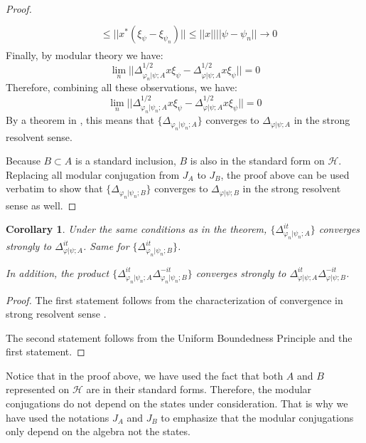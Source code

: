 \documentclass[a4paper,11pt]{article}
\newtheorem{corollary}[theorem]{Corollary}
\theoremstyle{definition}
\theoremstyle{remark}
\begin{document}
\begin{proof}
\begin{align}
\begin{split}
            \\&
            \leq ||x^*(\xi_\psi - \xi_{\psi_n})|| \leq ||x||||\psi - \psi_n||\rightarrow 0
        \end{split}
    \end{align}
    Finally, by modular theory we have:
    \begin{equation}
        \lim_n||\Delta^{1/2}_{\varphi_n|\psi;A}x\xi_\psi - \Delta^{1/2}_{\varphi|\psi;A}x\xi_\psi|| = 0
    \end{equation}
    Therefore, combining all these observations, we have:
    \begin{equation}
        \lim_n||\Delta^{1/2}_{\varphi_n|\psi_n;A}x\xi_\psi - \Delta^{1/2}_{\varphi|\psi;A}x\xi_\psi|| = 0
    \end{equation}
    By a theorem in \cite{takesaki2}, this means that $\{\Delta_{\varphi_n|\psi_n;A}\}$ converges to $\Delta_{\varphi|\psi;A}$ in the strong resolvent sense. 

    Because $B\subset A$ is a standard inclusion, $B$ is also in the standard form on $\mathcal{H}$. Replacing all modular conjugation from $J_A$ to $J_B$, the proof above can be used verbatim to show that $\{\Delta_{\varphi_n|\psi_n;B}\}$ converges to $\Delta_{\varphi|\psi;B}$ in the strong resolvent sense as well.
\end{proof}
\begin{corollary}
    Under the same conditions as in the theorem, $\{\Delta^{it}_{\varphi_n|\psi_n;A}\}$ converges strongly to $\Delta^{it}_{\varphi|\psi;A}$. Same for $\{\Delta^{it}_{\varphi_n|\psi_n;B}\}$.

    In addition, the product $\{\Delta^{it}_{\varphi_n|\psi_n;A}\Delta^{-it}_{\varphi_n|\psi_n;B}\}$ converges strongly to $\Delta^{it}_{\varphi|\psi;A}\Delta^{-it}_{\varphi|\psi;B}$.
\end{corollary}
\begin{proof}
    The first statement follows from the characterization of convergence in strong resolvent sense \cite{takesaki2}.

    The second statement follows from the Uniform Boundedness Principle and the first statement.
\end{proof}
Notice that in the proof above, we have used the fact that both $A$ and $B$ represented on $\mathcal{H}$ are in their standard forms. Therefore, the modular conjugations do not depend on the states under consideration. That is why we have used the notations $J_A$ and $J_B$ to emphasize that the modular conjugations only depend on the algebra not the states.
\end{document}
